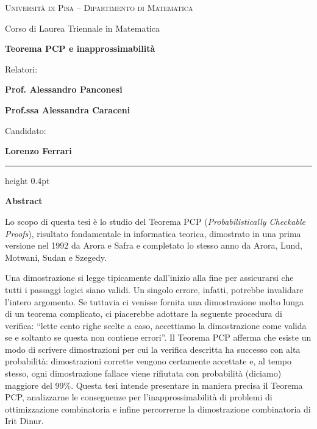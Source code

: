 \documentclass[12pt]{article}
\begin{document}
\pagestyle{empty}

\begin{center}
  {\small\scshape Università di Pisa -- Dipartimento di Matematica \par}
  {\small Corso di Laurea Triennale in Matematica \par}
  \vspace{0.8em}
  {\Large\bfseries Teorema PCP e inapprossimabilità \par}
\end{center}

\vspace{0.8em}

\noindent
\begin{minipage}[t]{0.47\textwidth}
  {\large Relatori: \par}
  \vspace{0.2em}
  {\bfseries\large Prof. Alessandro Panconesi \par}
  {\bfseries\large Prof.ssa Alessandra Caraceni \par}
\end{minipage}%
\hfill
\begin{minipage}[t]{0.47\textwidth}\raggedleft
  {\large Candidato: \par}
  \vspace{0.2em}
  {\bfseries\large Lorenzo Ferrari \par}
\end{minipage}

\vspace{0.8em}
\hrule height 0.4pt
\vspace{0.8em}

\begin{center}
  {\large\bfseries Abstract \par}
\end{center}
\vspace{0.2em}

Lo scopo di questa tesi è lo studio del Teorema PCP (\emph{Probabilistically
Checkable Proofs}), risultato fondamentale in informatica teorica, dimostrato
in una prima versione nel 1992 da Arora e Safra e completato lo stesso anno da
Arora, Lund, Motwani, Sudan e Szegedy.

Una dimostrazione si legge tipicamente dall'inizio alla fine per assicurarsi
che tutti i passaggi logici siano validi. Un singolo errore, infatti, potrebbe
invalidare l'intero argomento.
Se tuttavia ci venisse fornita una dimostrazione molto lunga di un teorema
complicato, ci piacerebbe adottare la seguente procedura di verifica: ``lette
cento righe scelte a caso, accettiamo la dimostrazione come valida se e soltanto
se questa non contiene errori''.
Il Teorema PCP afferma che esiste un modo di scrivere dimostrazioni per cui la
verifica descritta ha successo con alta probabilità:
dimostrazioni corrette vengono certamente accettate e, al tempo stesso,
ogni dimostrazione fallace viene rifiutata con probabilità (diciamo) maggiore
del 99\%.
Questa tesi intende presentare in maniera precisa il Teorema PCP, analizzarne le
conseguenze per l'inapprossimabilità di problemi di ottimizzazione combinatoria
e infine percorrerne la dimostrazione combinatoria di Irit Dinur.
\end{document}
